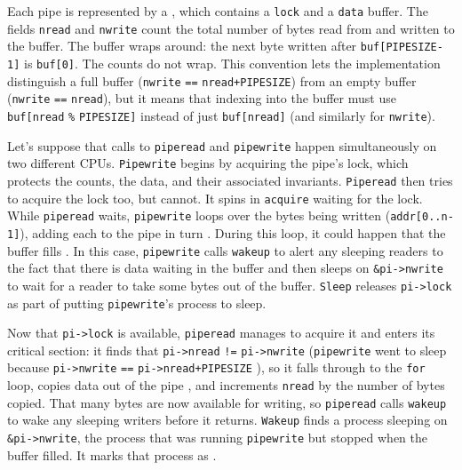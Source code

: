 Each pipe
is represented by a 
,
which contains
a 
\lstinline{lock}
and a 
\lstinline{data}
buffer.
The fields
\lstinline{nread}
and
\lstinline{nwrite}
count the total number of bytes read from
and written to the buffer.
The buffer wraps around:
the next byte written after
\lstinline{buf[PIPESIZE-1]}
is 
\lstinline{buf[0]}.
The counts do not wrap.
This convention lets the implementation
distinguish a full buffer 
(\lstinline{nwrite}
\lstinline{==}
\lstinline{nread+PIPESIZE})
from an empty buffer
(\lstinline{nwrite}
\lstinline{==}
\lstinline{nread}),
but it means that indexing into the buffer
must use
\lstinline{buf[nread}
\lstinline{%}
\lstinline{PIPESIZE]}
instead of just
\lstinline{buf[nread]} 
(and similarly for
\lstinline{nwrite}).

Let's suppose that calls to
\lstinline{piperead}
and
\lstinline{pipewrite}
happen simultaneously on two different CPUs.
\lstinline{Pipewrite}
begins by acquiring the pipe's lock, which
protects the counts, the data, and their
associated invariants.
\lstinline{Piperead}
then tries to acquire the lock too, but cannot.
It spins in
\lstinline{acquire}
waiting for the lock.
While
\lstinline{piperead}
waits,
\lstinline{pipewrite}
loops over the bytes being written
(\lstinline{addr[0..n-1]}),
adding each to the pipe in turn
.
During this loop, it could happen that
the buffer fills
.
In this case, 
\lstinline{pipewrite}
calls
\lstinline{wakeup}
to alert any sleeping readers to the fact
that there is data waiting in the buffer
and then sleeps on
\lstinline{&pi->nwrite}
to wait for a reader to take some bytes
out of the buffer.
\lstinline{Sleep}
releases 
\lstinline{pi->lock}
as part of putting
\lstinline{pipewrite}'s
process to sleep.

Now that
\lstinline{pi->lock}
is available,
\lstinline{piperead}
manages to acquire it and enters its critical section:
it finds that
\lstinline{pi->nread}
\lstinline{!=}
\lstinline{pi->nwrite}
(\lstinline{pipewrite}
went to sleep because
\lstinline{pi->nwrite}
\lstinline{==}
\lstinline{pi->nread+PIPESIZE}
),
so it falls through to the 
\lstinline{for}
loop, copies data out of the pipe
,
and increments 
\lstinline{nread}
by the number of bytes copied.
That many bytes are now available for writing, so
\lstinline{piperead}
calls
\lstinline{wakeup}
to wake any sleeping writers
before it returns.
\lstinline{Wakeup}
finds a process sleeping on
\lstinline{&pi->nwrite},
the process that was running
\lstinline{pipewrite}
but stopped when the buffer filled.
It marks that process as
.

